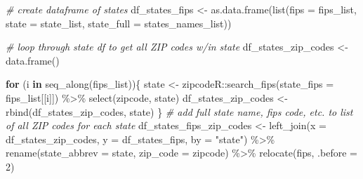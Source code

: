 \documentclass[
  11 pt,
  openany]{book}
\newenvironment{Shaded}{\begin{snugshade}}{\end{snugshade}}
\newcommand{\AttributeTok}[1]{\textcolor[rgb]{0.77,0.63,0.00}{#1}}
\newcommand{\CommentTok}[1]{\textcolor[rgb]{0.56,0.35,0.01}{\textit{#1}}}
\newcommand{\ControlFlowTok}[1]{\textcolor[rgb]{0.13,0.29,0.53}{\textbf{#1}}}
\newcommand{\DecValTok}[1]{\textcolor[rgb]{0.00,0.00,0.81}{#1}}
\newcommand{\FunctionTok}[1]{\textcolor[rgb]{0.00,0.00,0.00}{#1}}
\newcommand{\NormalTok}[1]{#1}
\newcommand{\OtherTok}[1]{\textcolor[rgb]{0.56,0.35,0.01}{#1}}
\newcommand{\SpecialCharTok}[1]{\textcolor[rgb]{0.00,0.00,0.00}{#1}}
\newcommand{\StringTok}[1]{\textcolor[rgb]{0.31,0.60,0.02}{#1}}
\begin{document}
\begin{Shaded}
\begin{Highlighting}[]
\CommentTok{\# create dataframe of states}
\NormalTok{df\_states\_fips }\OtherTok{\textless{}{-}} \FunctionTok{as.data.frame}\NormalTok{(}\FunctionTok{list}\NormalTok{(}\AttributeTok{fips =}\NormalTok{ fips\_list,}
                                     \AttributeTok{state =}\NormalTok{ state\_list,}
                                     \AttributeTok{state\_full =}\NormalTok{ states\_names\_list))}

\CommentTok{\# loop through state df to get all ZIP codes w/in state}
\NormalTok{df\_states\_zip\_codes }\OtherTok{\textless{}{-}} \FunctionTok{data.frame}\NormalTok{()}

\ControlFlowTok{for}\NormalTok{ (i }\ControlFlowTok{in} \FunctionTok{seq\_along}\NormalTok{(fips\_list))\{}
\NormalTok{  state }\OtherTok{\textless{}{-}}\NormalTok{ zipcodeR}\SpecialCharTok{::}\FunctionTok{search\_fips}\NormalTok{(}\AttributeTok{state\_fips =}\NormalTok{ fips\_list[[i]]) }\SpecialCharTok{\%\textgreater{}\%} 
    \FunctionTok{select}\NormalTok{(zipcode, state)}
\NormalTok{  df\_states\_zip\_codes }\OtherTok{\textless{}{-}} \FunctionTok{rbind}\NormalTok{(df\_states\_zip\_codes, state)}
\NormalTok{\}}
\CommentTok{\# add full state name, fips code, etc. to list of all ZIP codes for each state}
\NormalTok{df\_states\_fips\_zip\_codes }\OtherTok{\textless{}{-}} 
  \FunctionTok{left\_join}\NormalTok{(}\AttributeTok{x =}\NormalTok{ df\_states\_zip\_codes,}
            \AttributeTok{y =}\NormalTok{ df\_states\_fips,}
            \AttributeTok{by =} \StringTok{"state"}\NormalTok{) }\SpecialCharTok{\%\textgreater{}\%} 
  \FunctionTok{rename}\NormalTok{(}\AttributeTok{state\_abbrev =}\NormalTok{ state,}
         \AttributeTok{zip\_code =}\NormalTok{ zipcode) }\SpecialCharTok{\%\textgreater{}\%} 
  \FunctionTok{relocate}\NormalTok{(fips, }\AttributeTok{.before =} \DecValTok{2}\NormalTok{)}



\end{Highlighting}
\end{Shaded}
\end{document}
